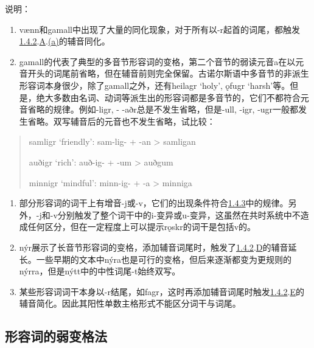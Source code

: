 说明：

\begin{enumerate}
\def\labelenumi{\arabic{enumi})}
\item
  vænn和gamall中出现了大量的同化现象，对于所有以-r起首的词尾，都触发\hyperref[ux8f85ux97f3ux7684ux97f3ux53d8]{1.4.2}.\hyperref[_Ref117517666]{A}.\hyperref[_Ref117517668]{(a)}的辅音同化。
\item
  gamall的代表了典型的多音节形容词的变格，第二个音节的弱读元音a在以元音开头的词尾前省略，但在辅音前则完全保留。古诺尔斯语中多音节的非派生形容词本身很少，除了gamall之外，还有heilagr
  `holy', ǫfugr
  `harsh'等。但是，绝大多数由名词、动词等派生出的形容词都是多音节的，它们不都符合元音省略的规律。例如-ligr,
  - -aðr总是不发生省略，但是-ull, -igr,
  -ugr一般都发生省略。双写辅音后的元音也不发生省略，试比较：
\end{enumerate}

\begin{quote}
samligr `friendly': sam-lig- + -an \textgreater{} samligan

auðigr `rich': auð-ig- + -um \textgreater{} auðgum

minnigr `mindful': minn-ig- + -a \textgreater{} minniga
\end{quote}

\begin{enumerate}
\def\labelenumi{\arabic{enumi})}
\setcounter{enumi}{2}
\item
  部分形容词的词干上有增音-j或-v，它们的出现条件符合\hyperref[ux534aux5143ux97f3ux7684ux4fddux6301ux6027]{1.4.3}中的规律。另外，-j和-v分别触发了整个词干中的i-变异或u-变异，这虽然在共时系统中不造成任何区分，但在一定程度上可以提示rǫskr的词干是包括v的。
\item
  nýr展示了长音节形容词的变格，添加辅音词尾时，触发了\hyperref[ux8f85ux97f3ux7684ux97f3ux53d8]{1.4.2}.\hyperref[_Ref116211616]{D}的辅音延长。一些早期的文本中nýra也是可行的变格，但后来逐渐都变为更规则的nýrra，但是nýtt中的中性词尾-t始终双写。
\item
  某些形容词词干本身以-r结尾，如fagr，这时再添加辅音词尾时触发\hyperref[ux8f85ux97f3ux7684ux97f3ux53d8]{1.4.2}.\hyperref[_Ref115765758]{E}的辅音简化。因此其阳性单数主格形式不能区分词干与词尾。
\end{enumerate}

\subsection{形容词的弱变格法}\label{ux5f62ux5bb9ux8bcdux7684ux5f31ux53d8ux683cux6cd5}

